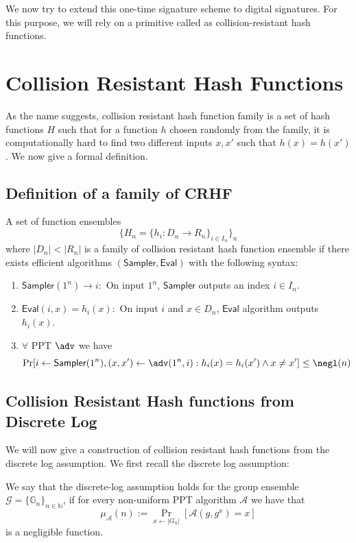 \documentclass[12pt]{tufte-book}
\newcommand{\Sampler}{\mathsf{Sampler}}
\newcommand{\Eval}{\mathsf{Eval}}
\begin{document}
We now try to extend this one-time signature scheme to digital signatures. For this purpose, we will rely on a primitive called as collision-resistant hash functions.


\section{Collision Resistant Hash Functions}

As the name suggests, collision resistant hash function family is a set of hash functions $H$ such that for a function $h$ chosen randomly from the family, it is computationally hard to find two different inputs $x,x'$ such that $h(x) = h(x')$. We now give a formal definition.

\subsection{Definition of a family of CRHF}

A set of function ensembles
\[ \{H_n = \{h_i : D_n \to R_n \}_{i \in I_n} \}_n\]
where $|D_n| < |R_n|$ is a family of collision resistant hash function ensemble if there exists efficient algorithms $(\Sampler,\Eval)$ with the following syntax:
\begin{enumerate}
\item $\Sampler(1^n) \to i:$ On input $1^n$, $\Sampler$ outputs an index $i \in I_n$.
\item $\Eval(i,x) = h_i(x):$ On input $i$ and $x \in D_n$, $\Eval$ algorithm outputs $h_i(x)$. 
\item $\forall$ PPT $\adv$ we have
\[\Pr[i \gets \Sampler(1^n), (x,x') \gets \adv(1^n,i) : h_i(x) = h_i(x') \wedge x \neq x'] \leq \negl(n)\]
\end{enumerate}


\subsection{Collision Resistant Hash functions from Discrete Log}
We will now give a construction of collision resistant hash functions from the discrete log assumption. We first recall the discrete log assumption:
\begin{definition}
We say that the discrete-log assumption holds for the group ensemble $\mathcal{G} =\{ \mathbb{G}_n\}_{n \in \mathbb{N}}$, if for every non-uniform PPT algorithm $\mathcal{A}$ we have that
\[\mu_\mathcal{A}(n) := \Pr_{x \leftarrow |G_n|}[\mathcal{A}(g,g^x) = x]\]
is a negligible function.
\end{definition}
\end{document}
